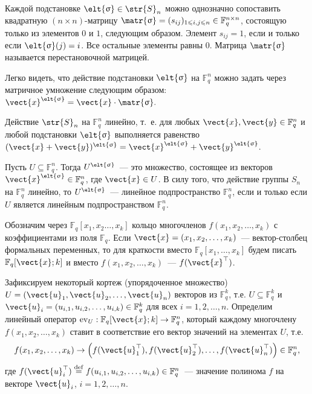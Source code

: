 \documentclass[12pt]{extarticle}
\begin{document}
Каждой подстановке \(\elt{\sigma}\in \str{S}_{n}\) можно однозначно сопоставить квадратную \((n\times n)\)-матрицу \(\matr{\sigma}=(s_{ij})_{1\le i,j\le n}\in \mathbb{F}^{n \times n}_{q}\), состоящую только из элементов \(0\) и \(1\), следующим образом.
Элемент \(s_{ij}=1\), если и только если \(\elt{\sigma}(j)=i\).
Все остальные элементы равны \(0\).
Матрица \(\matr{\sigma}\) называется перестановочной матрицей.

Легко видеть, что действие подстановки \(\elt{\sigma}\) на \(\mathbb{F}^n_q\) можно задать через матричное умножение следующим образом:
\(\vect{x}^{\elt{\sigma}}=\vect{x}\cdot \matr{\sigma}.\)

Действие \(\str{S}_{n}\) на \(\mathbb{F}^n_q\) линейно, т.~е. для любых \(\vect{x}, \vect{y}\in \mathbb{F}^n_q\) и любой подстановки \(\elt{\sigma}\) выполняется равенство \((\vect{x}+\vect{y})^{\elt{\sigma}}=\vect{x}^{\elt{\sigma}}+\vect{y}^{\elt{\sigma}}\).

Пусть \(U\subseteq \mathbb{F}^n_q\).
Тогда \(U^{\elt{\sigma}}\)~--- это множество, состоящее из векторов \(\vect{x}^{\elt{\sigma}}\in \mathbb{F}^n_q\), где \(\vect{x}\in U\).
В силу того, что действие группы \(S_n\) на \(\mathbb{F}^n_q\) линейно, то \(U^{\elt{\sigma}}\)~--- линейное подпространство \(\mathbb{F}^n_q\), если и только если \(U\) является линейным подпространством \(\mathbb{F}^n_q\).

Обозначим через \(\mathbb{F}_{q}[x_1,x_{2}\dotsc, x_{k}]\) кольцо многочленов \(f(x_1, x_2,\dotsc, x_{k})\) с коэффициентами из поля \(\mathbb{F}_{q}\).
Если \(\vect{x}=(x_1,x_2, \dotsc, x_{k})\)~--- вектор-столбец формальных переменных, то для краткости вместо \(\mathbb{F}_{q}[x_1,\dotsc, x_{k}]\) будем писать \(\mathbb{F}_{q}[\vect{x};k]\) и вместо \(f(x_1,x_2, \dotsc, x_k)\)~--- \(f(\vect{x}^{\top})\).

Зафиксируем некоторый кортеж (упорядоченное множество) \(U= \left(\vect{u}_1, \vect{u}_2, \dotsc, \vect{u}_{n}\right)\) векторов из \(\mathbb{F}^k_{q}\), т.е. \(U\subseteq \mathbb{F}^{k}_{q}\) и \(\vect{u}_i=(u_{i,1}, u_{i,2}, \dotsc, u_{i,k})\in \mathbb{F}^{k}_{q}\) для всех \(i=1,2, \dotsc, n\).
Определим линейный оператор \(\operatorname{ev}_{U}: \mathbb{F}_{q}[\vect{x};k] \rightarrow  \mathbb{F}^{n}_{q}\), который каждому многочлену \(f(x_1, x_2, \dotsc, x_{k})\) ставит в соответствие его вектор значений на элементах \(U\), т.е.
\[ f(x_1,x_2, \dotsc, x_k) \rightarrow \left(f(\vect{u}^{\top}_{1}), f(\vect{u}^{\top}_{2}), \dotsc, f(\vect{u}^{\top}_{n})\right)\in \mathbb{F}^{n}_{q}, \]
где \(f(\vect{u}^{\top}_i) \stackrel{\mathrm{def}}{=} f(u_{i,1}, u_{i,2}, \dotsc, u_{i,k})\in \mathbb{F}^{n}_{q}\)~--- значение полинома \(f\) на векторе \(\vect{u}_{i}\), \(i=1,2, \dotsc, n\).
\end{document}

